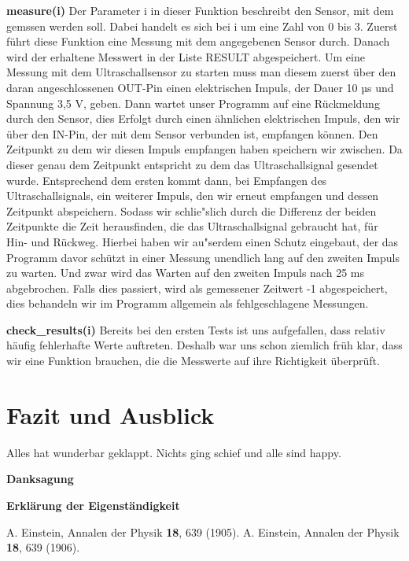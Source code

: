 \documentclass[a4paper,12pt]{article}
\begin{document}
\textbf{measure(i)}
\newline
Der Parameter i in dieser Funktion beschreibt den Sensor, mit dem gemssen werden soll.
Dabei handelt es sich bei i um eine Zahl von 0 bis 3.
Zuerst f\"uhrt diese Funktion eine Messung mit dem angegebenen Sensor durch.
Danach wird der erhaltene Messwert in der Liste RESULT abgespeichert.
Um eine Messung mit dem Ultraschallsensor zu starten muss man diesem zuerst \"uber den daran angeschlossenen OUT-Pin einen elektrischen Impuls, der Dauer 10 µs und Spannung 3,5 V, geben.
Dann wartet unser Programm auf eine R\"uckmeldung durch den Sensor, dies Erfolgt durch einen \"ahnlichen elektrischen Impuls, den wir \"uber den IN-Pin, der mit dem Sensor verbunden ist, empfangen k\"onnen.
Den Zeitpunkt zu dem wir diesen Impuls empfangen haben speichern wir zwischen.
Da dieser genau dem Zeitpunkt entspricht zu dem das Ultraschallsignal gesendet wurde.
Entsprechend dem ersten kommt dann, bei Empfangen des Ultraschallsignals, ein weiterer Impuls, den wir erneut empfangen und dessen Zeitpunkt abspeichern.
Sodass wir schlie"slich durch die Differenz der beiden Zeitpunkte die Zeit herausfinden, die das Ultraschallsignal gebraucht hat, f\"ur Hin- und R\"uckweg.
Hierbei haben wir au"serdem einen Schutz eingebaut, der das Programm davor sch\"utzt in einer Messung unendlich lang auf den zweiten Impuls zu warten.
Und zwar wird das Warten auf den zweiten Impuls nach 25 ms abgebrochen.
Falls dies passiert, wird als gemessener Zeitwert -1 abgespeichert, dies behandeln wir im Programm allgemein als fehlgeschlagene Messungen.

\medskip

\textbf{check\_results(i)}
\newline
Bereits bei den ersten Tests ist uns aufgefallen, dass relativ h\"aufig fehlerhafte Werte auftreten.
Deshalb war uns schon ziemlich fr\"uh klar, dass wir eine Funktion brauchen, die die Messwerte auf ihre Richtigkeit \"uberpr\"uft.

\section{Fazit und Ausblick}\label{sec3}

Alles hat wunderbar geklappt. Nichts ging schief und alle sind happy.


\bigskip


{\large\bf Danksagung}

\bigskip


{\large\bf Erkl\"arung der Eigenst\"andigkeit}

\bigskip


\begin{thebibliography}{99}
	\itemsep-2pt \small\frenchspacing
	A. Einstein, Annalen der Physik {\bf 18}, 639 (1905).
	\newline
	A. Einstein, Annalen der Physik {\bf 18}, 639 (1906).
\end{thebibliography}
\end{document}
